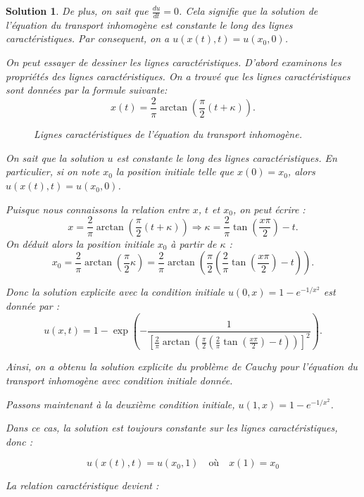\documentclass[10pt]{article}
\theoremstyle{frenchstyle}
\newtheorem{solution}{Solution}
\begin{document}
\begin{solution}
	De plus, on sait que $\frac{du}{dt}=0$. Cela signifie que la solution de l'équation du transport inhomogène est constante le long des lignes caractéristiques. Par consequent, on a $u(x(t),t)=u(x_0,0)$.

	On peut essayer de dessiner les lignes caractéristiques. D'abord examinons les propriétés des lignes caractéristiques. On a trouvé que les lignes caractéristiques sont données par la formule suivante:
	\[
		x(t) = \frac{2}{\pi}\arctan\left(\frac{\pi}{2}(t + \kappa)\right).
	\]

	\begin{figure}[h]
		\centering
		
		\caption{Lignes caractéristiques de l'équation du transport inhomogène.}
		\label{fig:lines_characteristics}
	\end{figure}

	On sait que la solution \( u \) est constante le long des lignes caractéristiques. En particulier, si on note \( x_0 \) la position initiale telle que \( x(0) = x_0 \), alors \( u(x(t), t) = u(x_0, 0) \).

	Puisque nous connaissons la relation entre \( x \), \( t \) et \( x_0 \), on peut écrire :
	\[
		x = \frac{2}{\pi} \arctan\left( \frac{\pi}{2}(t + \kappa) \right) \Rightarrow \kappa = \frac{2}{\pi} \tan\left( \frac{x\pi}{2} \right) - t.
	\]
	On déduit alors la position initiale \( x_0 \) à partir de \( \kappa \) :
	\[
		x_0 = \frac{2}{\pi} \arctan\left( \frac{\pi}{2} \kappa \right) = \frac{2}{\pi} \arctan\left( \frac{\pi}{2} \left( \frac{2}{\pi} \tan\left( \frac{x\pi}{2} \right) - t \right) \right).
	\]

	Donc la solution explicite avec la condition initiale \( u(0,x) = 1 - e^{-1/x^2} \) est donnée par :
	\[
		u(x, t) = 1 - \exp\left( -\frac{1}{\left[ \frac{2}{\pi} \arctan\left( \frac{\pi}{2} \left( \frac{2}{\pi} \tan\left( \frac{x\pi}{2} \right) - t \right) \right) \right]^2} \right).
	\]

	Ainsi, on a obtenu la solution explicite du problème de Cauchy pour l'équation du transport inhomogène avec condition initiale donnée.

	Passons maintenant à la deuxième condition initiale, \( u(1, x) = 1 - e^{-1/x^2} \).

	Dans ce cas, la solution est toujours constante sur les lignes caractéristiques, donc :

	\[
		u(x(t), t) = u(x_0, 1) \quad \text{où} \quad x(1) = x_0
	\]

	La relation caractéristique devient :


\end{solution}
\end{document}
